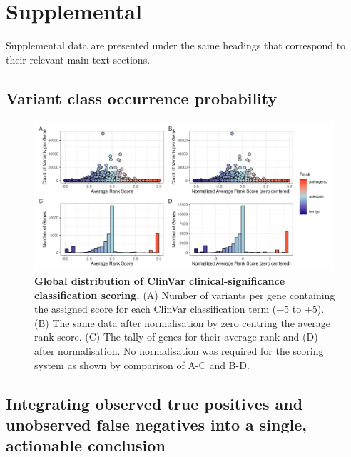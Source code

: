 \section{Supplemental} \label{Supplemental_text}

Supplemental data are presented under the same headings that correspond to their relevant main text sections. 

\subsection{Variant class occurrence probability}
\begin{figure}[ht]
  \centering
  \includegraphics[width=0.99\textwidth]{../images/p_gene_summary_hist_patch3.png}
\caption{\textbf{Global distribution of ClinVar clinical-significance classification scoring.} 
(A) Number of variants per gene containing the assigned score for each ClinVar classification term (−5 to +5). 
(B) The same data after normalisation by zero centring the average rank score.
(C) The tally of genes for their average rank and (D) after normalisation. No normalisation was required for the scoring system as shown by comparison of A-C and B-D.}
  \label{fig:p_gene_summary_hist_patch3}
\end{figure}

\clearpage
\subsection{Integrating observed true positives and unobserved false negatives into a single, actionable conclusion}







